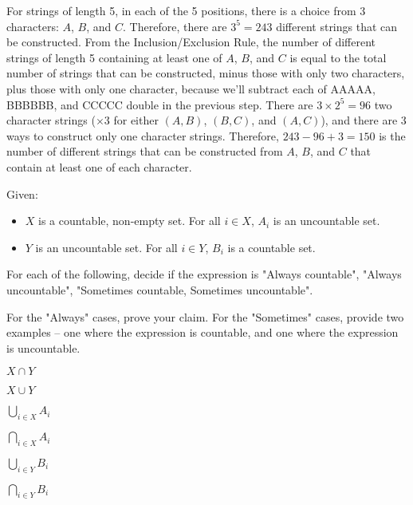 \documentclass[11pt]{article}
\begin{document}
\begin{solution}
    \begin{Parts}
        \Part For strings of length 5, in each of the 5 positions, there is a
        choice from 3 characters: $A$, $B$, and $C$. Therefore, there are $3^5
        = 243$ different strings that can be constructed. 
        \Part From the Inclusion/Exclusion Rule, the number of different strings
        of length 5 containing at least one of $A$, $B$, and $C$ is equal to the
        total number of strings that can be constructed, minus those with only 
        two characters, plus those with only one character, because we'll subtract
        each of AAAAA, BBBBBB, and CCCCC double in the previous step. There
        are $3 \times 2^5 = 96$ two character strings ($\times 3$ for either $(A, B)$,
        $(B, C)$, and $(A, C)$), and there are 3 ways to construct only one character 
        strings. Therefore, $243-96+3=150$ is the number of different strings that
        can be constructed from $A$, $B$, and $C$ that contain at least one of each
        character. 
    \end{Parts}
\end{solution}


Given:
\begin{itemize}
\item $X$ is a countable, non-empty set. For all $i \in X$, $A_i$ is an uncountable set.
\item $Y$ is an uncountable set. For all $i \in Y$, $B_i$ is a countable set.
\end{itemize}

For each of the following, decide if the expression is
"Always countable", "Always uncountable", "Sometimes countable,
Sometimes uncountable".

For the "Always" cases, prove your claim. For the "Sometimes" cases, provide
two examples -- one where the expression is countable, and one where
the expression is uncountable.

\begin{Parts}

    \Part $X \cap Y$

    \Part $X \cup Y$
        
    \Part $\bigcup_{i \in X} A_i$

    \Part $\bigcap_{i \in X} A_i$

    \Part $\bigcup_{i \in Y} B_i$

\Part $\bigcap_{i \in Y} B_i$

\end{Parts}
\end{document}
